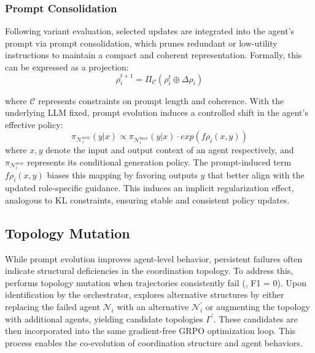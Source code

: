 \subsubsection{Prompt Consolidation}
\vspace{-2pt}
Following variant evaluation, selected updates are integrated into the agent’s prompt via prompt consolidation, which prunes redundant or low-utility instructions to maintain a compact and coherent representation. Formally, this can be expressed as a projection:
\vspace{-2pt}
\[
\rho_{i}^{t+1} = \Pi_{\mathcal{C}}\left(\rho_{i}^{t} \oplus \Delta \rho_{i}\right)
\]

where $\mathcal{C}$ represents constraints on prompt length and coherence. With the underlying LLM fixed, prompt evolution induces a controlled shift in the agent’s effective policy:
\[
\pi_{\mathcal{N}_{i}^{new}}(y|x)\propto\pi_{\mathcal{N}_{i}^{base}}(y|x)\cdot exp(f{\rho_{i}}(x, y))
\]
where $x, y$ denote the input and output context of an agent respectively, and $\pi_{\mathcal{N}_{i}^{new}}$ represents its conditional generation policy. The prompt-induced term $f{\rho_{i}}(x, y)$
biases this mapping by favoring outputs 
$y$ that better align with the updated role-specific guidance. This induces an implicit regularization effect, analogous to KL constraints, ensuring stable and consistent policy updates.
\vspace{-8pt}
\subsection{Topology Mutation}
\vspace{-8pt}
While prompt evolution improves agent-level behavior, persistent failures often indicate structural deficiencies in the coordination topology. To address this, \hero performs topology mutation when trajectories consistently fail (\eg, F1 = 0). Upon identification by the orchestrator, \hero explores alternative structures by either replacing the failed agent $\mathcal{N}_{i}$ with an alternative $\mathcal{N}_{i}^{'}$ or augmenting the topology with additional agents, yielding candidate topologies $\Gamma^{'}$. These candidates are then incorporated into the same gradient-free GRPO optimization loop. This process enables the co-evolution of coordination structure and agent behaviors.
